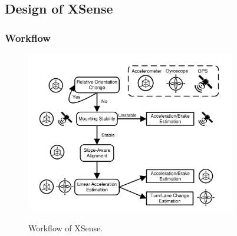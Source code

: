 



\subsection{Design of XSense}


\subsubsection{Workflow}

\begin{figure}[!htbp]
\begin{center}
\includegraphics[width=3.6in, angle=0]{Figs/DriveSense/system_flowchart.pdf}
\vspace{-0.2cm}
\caption{Workflow of XSense.}
\vspace{-0.6cm}
\label{workflow}
\end{center}
\end{figure}


